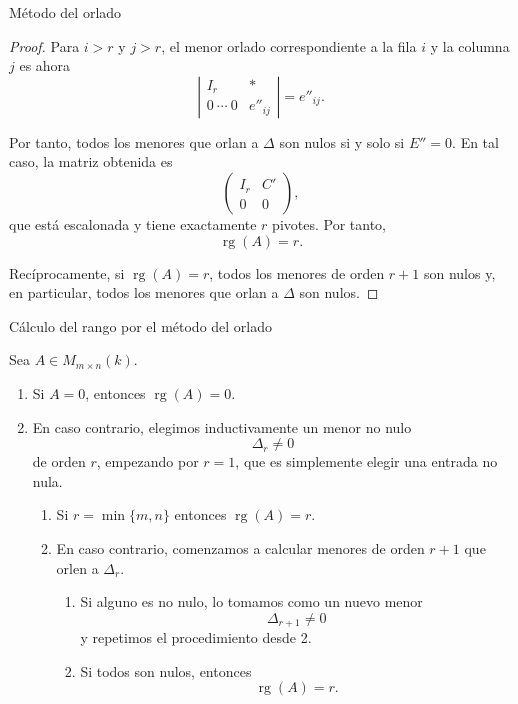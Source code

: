 \begin{frame}[allowframebreaks, t]{Método del orlado}
\begin{proof}
Para \(i>r\) y \(j>r\), el menor orlado correspondiente a la fila
\(i\) y la columna \(j\) es ahora
\[
\left|
\begin{array}{c|c}
I_r & *\\
\hline
0\ \cdots\ 0 & e''_{ij}
\end{array}
\right|
=e''_{ij}.
\]

Por tanto, todos los menores que orlan a \(\Delta\) son nulos si y
solo si
\(
E''=0.
\)
En tal caso, la matriz obtenida es
\[
\left(
\begin{array}{c|c}
I_r & C'\\
\hline
0 & 0
\end{array}
\right),
\]
que está escalonada y tiene exactamente \(r\) pivotes. Por tanto,
\[
\operatorname{rg}(A)=r.
\]

Recíprocamente, si \(\operatorname{rg}(A)=r\), todos los menores de
orden \(r+1\) son nulos y, en particular, todos los menores que orlan
a \(\Delta\) son nulos.

\end{proof}

\end{frame}

\begin{frame}{Cálculo del rango por el método del orlado}

Sea \(A\in M_{m\times n}(k)\).

\begin{enumerate}
\item Si \(A=0\), entonces
\(
\operatorname{rg}(A)=0.
\)

\item En caso contrario, elegimos inductivamente un menor no nulo
\[
\Delta_r \neq0
\]
de orden \(r\), empezando por $r=1$, que es simplemente elegir una entrada no nula.
\begin{enumerate}

\item Si $r=\min\{m,n\}$ entonces $\operatorname{rg}(A)=r$.

\item En caso contrario, comenzamos a calcular menores de orden \(r+1\) que orlen a
\(\Delta_r\).
\begin{enumerate}
\item Si alguno es no nulo, lo tomamos como un nuevo menor
\[
\Delta_{r+1}\neq0
\]
y repetimos el procedimiento desde \alert{2.}

\item Si todos son nulos, entonces
\[
\operatorname{rg}(A)=r.
\]
\end{enumerate}
\end{enumerate}
\end{enumerate}

\end{frame}

